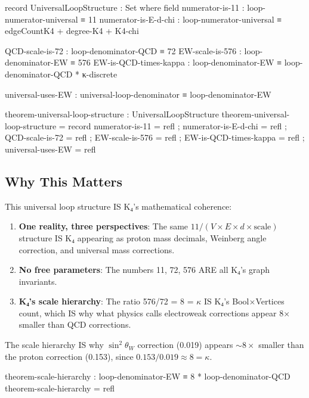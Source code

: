 \documentclass[11pt,a4paper]{book}
\begin{document}
\begin{code}
record UniversalLoopStructure : Set where
  field
    numerator-is-11 : loop-numerator-universal ≡ 11
    numerator-is-E-d-chi : loop-numerator-universal ≡ edgeCountK4 + degree-K4 + K4-chi
    
    QCD-scale-is-72 : loop-denominator-QCD ≡ 72
    EW-scale-is-576 : loop-denominator-EW ≡ 576
    EW-is-QCD-times-kappa : loop-denominator-EW ≡ loop-denominator-QCD * κ-discrete
    
    universal-uses-EW : universal-loop-denominator ≡ loop-denominator-EW

theorem-universal-loop-structure : UniversalLoopStructure
theorem-universal-loop-structure = record
  { numerator-is-11 = refl
  ; numerator-is-E-d-chi = refl
  ; QCD-scale-is-72 = refl
  ; EW-scale-is-576 = refl
  ; EW-is-QCD-times-kappa = refl
  ; universal-uses-EW = refl
  }
\end{code}

\subsection{Why This Matters}

This universal loop structure IS K₄'s mathematical coherence:

\begin{enumerate}
\item \textbf{One reality, three perspectives}: The same $11/(V \times E \times d \times \text{scale})$ structure IS K₄ appearing as proton mass decimals, Weinberg angle correction, and universal mass corrections.

\item \textbf{No free parameters}: The numbers 11, 72, 576 ARE all K₄'s graph invariants.

\item \textbf{K₄'s scale hierarchy}: The ratio 576/72 = 8 = $\kappa$ IS K₄'s Bool$\times$Vertices count, which IS why what physics calls electroweak corrections appear 8× smaller than QCD corrections.
\end{enumerate}

The scale hierarchy IS why $\sin^2\theta_W$ correction (0.019) appears $\sim 8\times$ smaller than the proton correction (0.153), since $0.153 / 0.019 \approx 8 = \kappa$.

\begin{code}
theorem-scale-hierarchy : loop-denominator-EW ≡ 8 * loop-denominator-QCD
theorem-scale-hierarchy = refl
\end{code}
\end{document}
